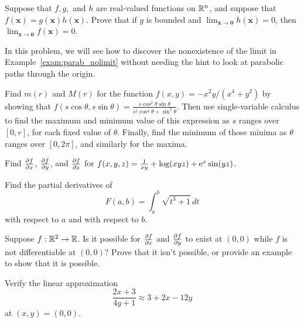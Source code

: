 \documentclass[prettycode,shellescape]{watsonbook}
\begin{document}
\begin{aexercise}
  Suppose that $f,g,$ and $h$ are real-valued functions on $\mathbb{R}^n$, and
  suppose that $f(\mathbf{x}) = g(\mathbf{x})h(\mathbf{x})$. Prove
  that if $g$ is bounded and
  $\lim_{\mathbf{x}\to \mathbf{0}}h(\mathbf{x}) = 0$, then
  $\lim_{\mathbf{x}\to \mathbf{0}}f(\mathbf{x}) = 0$.
\end{aexercise}

\begin{aexercise}
  In this problem, we will see how to discover the nonexistence of the
  limit in Example~\ref{exam:parab_nolimit} without needing the hint
  to look at parabolic paths through the origin.

  Find $m(r)$ and $M(r)$ for the function $f(x,y) = -x^2y/(x^4 + y^2)$
  by showing that
  $f(s\cos \theta, s\sin \theta) = \frac{s \cos^{2}{\theta}
    \sin{\theta}}{s^{2} \cos^{4}{\theta} + \sin^{2}{\theta}}$. Then
  use single-variable calculus to find the maximum and minimum value
  of this expression as $s$ ranges over $[0,r]$, for each fixed value
  of $\theta$. Finally, find the minimum of those minima as
  $\theta$ ranges over $[0,2\pi]$, and similarly for the maxima. 
\end{aexercise}



\begin{aexercise}
  Find $\frac{\partial f}{\partial x}$, $\frac{\partial f}{\partial y}$, and $\frac{\partial f}{\partial z}$ for
  $f(x,y,z) = \frac{1}{xy} + \log(xyz) + \mathrm{e}^x\sin(y z) $.
\end{aexercise}

\begin{aexercise}
  Find the partial derivatives of
  \[
    F(a,b) = \int_a^b \sqrt{t^3+1}\,dt
  \]
  with respect to $a$ and with respect to $b$.
\end{aexercise}

\begin{aexercise}
  Suppose $f:\mathbb{R}^2 \to \mathbb{R}$. Is it possible for $\frac{\partial f}{\partial x}$ and
  $\frac{\partial f}{\partial y}$ to exist at $(0,0)$ while $f$ is not differentiable at
  $(0,0)$?  Prove that it isn't possible, or provide an example to
  show that it is possible.
\end{aexercise}


\begin{aexercise}
  Verify the linear approximation
  \[
    \frac{2x+3}{4y+1} \approx 3 + 2x - 12y
  \]
  at $(x,y) = (0,0)$.
\end{aexercise}
\end{document}
